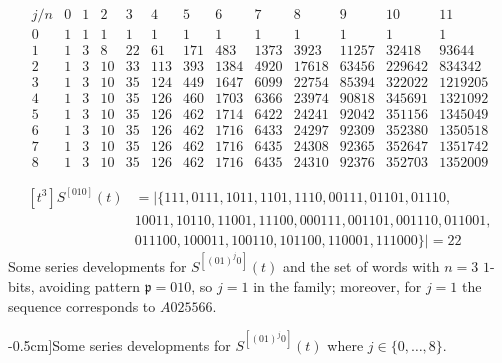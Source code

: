 \begin{table}
\begin{equation*}
\begin{array}{c|cccccccccccc}
    j/n & 0 & 1 & 2 & 3 & 4 & 5 & 6 & 7 & 8 & 9 & 10 & 11\\\hline0 & 1 & 1 & 1 & 1 & 1 & 1 & 1 & 1 & 1 & 1 & 1 & 1\\1 & 1 & 3 & 8 & 22 & 61 & 171 & 483 & 1373 & 3923 & 11257 & 32418 & 93644\\2 & 1 & 3 & 10 & 33 & 113 & 393 & 1384 & 4920 & 17618 & 63456 & 229642 & 834342\\3 & 1 & 3 & 10 & 35 & 124 & 449 & 1647 & 6099 & 22754 & 85394 & 322022 & 1219205\\4 & 1 & 3 & 10 & 35 & 126 & 460 & 1703 & 6366 & 23974 & 90818 & 345691 & 1321092\\5 & 1 & 3 & 10 & 35 & 126 & 462 & 1714 & 6422 & 24241 & 92042 & 351156 & 1345049\\6 & 1 & 3 & 10 & 35 & 126 & 462 & 1716 & 6433 & 24297 & 92309 & 352380 & 1350518\\7 & 1 & 3 & 10 & 35 & 126 & 462 & 1716 & 6435 & 24308 & 92365 & 352647 & 1351742\\8 & 1 & 3 & 10 & 35 & 126 & 462 & 1716 & 6435 & 24310 & 92376 & 352703 & 1352009
\end{array}
\end{equation*}

\begin{displaymath}
    \begin{split}
    [t^{3}]S^{[010]}(t) &= \big|\lbrace 111, 0111, 1011, 1101, 1110, 00111, 01101, 01110, \\
            & 10011, 10110, 11001, 11100, 000111, 001101, 001110, 011001, \\
            & 011100, 100011, 100110, 101100, 110001, 111000 \rbrace\big| = 22
    \end{split}
\end{displaymath}
{Some series developments for $S^{[(01)^{j}0]}(t)$ and the set of words with
$n=3$ $1$-bits, avoiding pattern $\mathfrak{p}=010$, so $j=1$ in the family;
moreover, for $j=1$ the sequence corresponds to $A025566$.}
\caption[][-0.5cm]{Some series developments for $S^{[(01)^{j}0]}(t)$ where $j\in
\lbrace 0,\ldots,8 \rbrace$.}
\label{tbl:S01_j:0}
\end{table}


